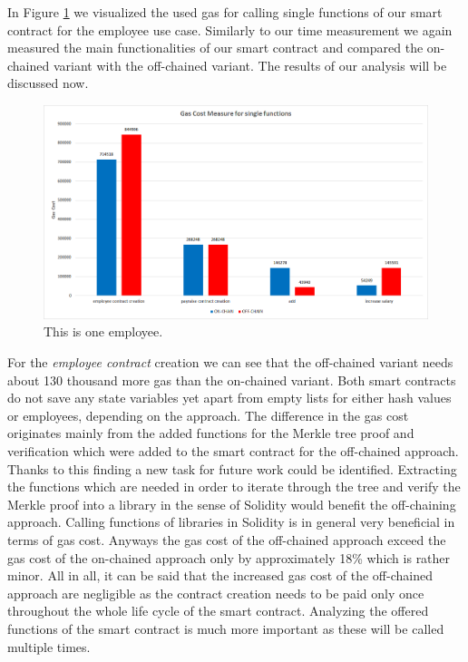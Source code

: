 In Figure \ref{fig:05_gas_cost_single} we visualized the used gas for calling single functions of our smart contract for the employee use case. Similarly to our time measurement we again measured the main functionalities of our smart contract and compared the on-chained variant with the off-chained variant. The results of our analysis will be discussed now.

\begin{figure}[t]
\centering
\includegraphics[width=1.0\textwidth]{images/05_evaluation/05_gas_cost_single.png}
\caption{\label{fig:05_gas_cost_single}This is one employee.}
\end{figure}

For the \textit{employee contract} creation we can see that the off-chained variant needs about 130 thousand more gas than the on-chained variant. Both smart contracts do not save any state variables yet apart from empty lists for either hash values or employees, depending on the approach. The difference in the gas cost originates mainly from the added functions for the Merkle tree proof and verification which were added to the smart contract for the off-chained approach. Thanks to this finding a new task for future work could be identified. Extracting the functions which are needed in order to iterate through the tree and verify the Merkle proof into a library in the sense of Solidity would benefit the off-chaining approach. Calling functions of libraries in Solidity is in general very beneficial in terms of gas cost. Anyways the gas cost of the off-chained approach exceed the gas cost of the on-chained approach only by approximately 18\% which is rather minor. All in all, it can be said that the increased gas cost of the off-chained approach are negligible as the contract creation needs to be paid only once throughout the whole life cycle of the smart contract. Analyzing the offered functions of the smart contract is much more important as these will be called multiple times.

